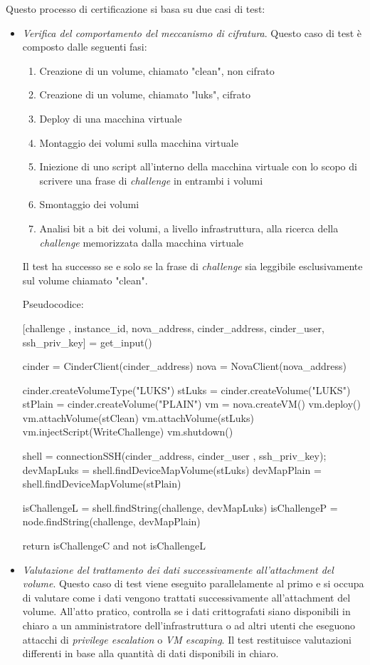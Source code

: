 \documentclass[../main.tex]{subfiles}
\begin{document}
Questo processo di certificazione si basa su due casi di test:
\begin{itemize}
\item \textit{Verifica del comportamento del meccanismo di cifratura}. Questo caso di test è composto dalle seguenti fasi:
\begin{enumerate}
\item Creazione di un volume, chiamato "clean", non cifrato
\item Creazione di un volume, chiamato "luks", cifrato
\item Deploy di una macchina virtuale
\item Montaggio dei volumi sulla macchina virtuale
\item Iniezione di uno script all'interno della macchina virtuale con lo scopo di scrivere una frase di \textit{challenge} in entrambi i volumi
\item Smontaggio dei volumi
\item Analisi bit a bit dei volumi, a livello infrastruttura, alla ricerca della \textit{challenge} memorizzata dalla macchina virtuale
\end{enumerate}
Il test ha successo se e solo se la frase di \textit{challenge} sia leggibile esclusivamente sul volume chiamato "clean".

Pseudocodice:

\begin{python}

[challenge , instance_id, nova_address, cinder_address, cinder_user, ssh_priv_key] = get_input()

cinder = CinderClient(cinder_address)
nova = NovaClient(nova_address)

cinder.createVolumeType("LUKS")
stLuks = cinder.createVolume("LUKS")
stPlain = cinder.createVolume("PLAIN")
vm = nova.createVM()
vm.deploy()
vm.attachVolume(stClean)
vm.attachVolume(stLuks)
vm.injectScript(WriteChallenge)
vm.shutdown()

shell = connectionSSH(cinder_address, cinder_user , ssh_priv_key);
devMapLuks = shell.findDeviceMapVolume(stLuks)
devMapPlain = shell.findDeviceMapVolume(stPlain)

isChallengeL = shell.findString(challenge, devMapLuks)
isChallengeP = node.findString(challenge, devMapPlain)

return isChallengeC and not isChallengeL
\end{python}

\item \textit{Valutazione del trattamento dei dati successivamente all'\textit{attachment} del volume}. Questo caso di test viene eseguito parallelamente al primo e si occupa di valutare come i dati vengono trattati successivamente all'attachment del volume. All'atto pratico, controlla se i dati crittografati siano disponibili in chiaro a un amministratore dell'infrastruttura o ad altri utenti che eseguono attacchi di \textit{privilege escalation} o \textit{VM escaping}. Il test restituisce valutazioni differenti in base alla quantità di dati disponibili in chiaro.


\end{itemize}
\end{document}
